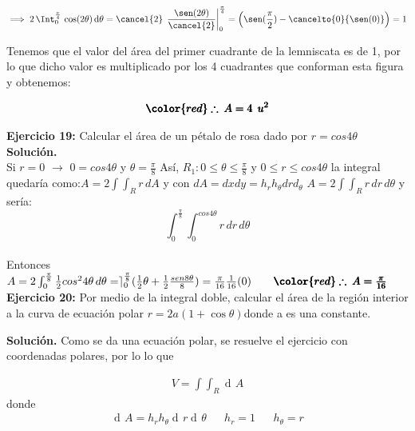 \documentclass[12pt]{article}
\DeclareMathOperator{\di}{d\!}
\begin{document}
\begin{align*}
	\implies 2\,\Int_{0}^{\frac{\pi}{4}}\, \cos(2\theta)\,\mathrm{d}\theta = \cancel{2}\,\left.\frac{\sen(2\theta)}{\cancel{2}}\right|_{0}^{\frac{\pi}{4}} = \left(\sen(\frac{\pi}{2}) - \cancelto{0}{\sen(0)}\right) = 1
\end{align*}

\noindent Tenemos que el valor del área del primer cuadrante de la lemniscata es de 1, por lo que dicho valor es multiplicado por los 4 cuadrantes que conforman esta figura y obtenemos:

\begin{align*}
	\pmb{\color{red} \therefore\: A = 4\: \: u^2}
\end{align*}

\textbf{Ejercicio 19:} Calcular el área de un pétalo de rosa dado por $r=cos4\theta$
\\[10pt]
\textbf{Solución.}
\\[10pt]
Si $r=0$ $\rightarrow$ $0=cos4\theta$ y $\theta=\frac{\pi}{8}$ Así, $R_{1}: 0\leq \theta \leq\frac{\pi}{8}$ y $0\leq r \leq cos4\theta$ la integral quedaría como:$ A=2\int \int_{R} r \,dA$ y con $dA=dxdy=h_{r}h_{\theta}drd_{\theta}$ \hspace{0.2cm} $A=2\int \int_{R} r \,dr \, d\theta$ y sería:
\[ \int_{0}^{\frac{\pi}{8}} \int_{0}^{cos4\theta} r \,dr\,d\theta \]
\\[2pt]
Entonces $A=2\int_{0}^{\frac{\pi}{8}}\frac{1}{2}cos^24\theta \,d\theta=\rceil_{0}^{\frac{\pi}{8}}(\frac{1}{2}\theta+\frac{1}{2}\frac{sen8\theta}{8})=\frac{\pi}{16}\frac{1}{16}(0) \qquad \pmb{\color{red} \therefore \: A=\frac{\pi}{16}}$
\\[15pt]

\noindent \textbf{Ejercicio 20:} Por medio de la integral doble, calcular el área de la región interior a la curva de
ecuación polar $r = 2a(1 + \cos \theta)$donde a es una constante.

\vspace{5mm}

\noindent \textbf{Solución.}
\vspace{3mm}
Como se da una ecuación polar, se resuelve el ejercicio con coordenadas polares, por lo
lo que 

\begin{align*}
	V = \int\int_{R} \di A
\end{align*}
donde
\begin{align*}
	\di A = h_{r}h_{\theta} \di r \di \theta && h_{r}=1 && h_{\theta} = r
\end{align*} 
\end{document}
